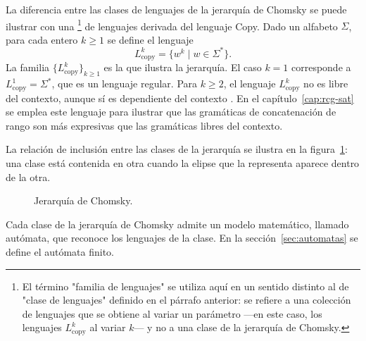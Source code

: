 \documentclass{article}
\theoremstyle{definition}
\theoremstyle{plain}
\theoremstyle{remark}
\begin{document}
La diferencia entre las clases de lenguajes de la jerarquía de Chomsky
se puede ilustrar con una  \footnote{El término "familia de
  lenguajes" se utiliza aquí en un sentido distinto al de "clase de
  lenguajes" definido en el párrafo anterior: se refiere a una colección
  de lenguajes que se obtiene al variar un parámetro ---en este caso,
  los lenguajes $L_{\mathrm{copy}}^k$ al variar $k$--- y no a una clase
  de la jerarquía de Chomsky.} de lenguajes derivada del lenguaje Copy.
Dado un alfabeto $\Sigma$, para cada entero $k \ge 1$ se define el
lenguaje
\[
  L_{\mathrm{copy}}^k = \{ w^k \mid w \in \Sigma^* \}.
\]
La familia $\{L_{\mathrm{copy}}^k\}_{k \ge 1}$ es la que ilustra la
jerarquía.
El caso $k = 1$ corresponde a $L_{\mathrm{copy}}^1 = \Sigma^*$, que es
un lenguaje regular. Para $k \ge 2$, el lenguaje $L_{\mathrm{copy}}^k$
no es libre del contexto, aunque sí es dependiente del contexto
\cite{hopcroft2006introduction}. En el capítulo~\ref{cap:rcg-sat} se
emplea este lenguaje para ilustrar que las gramáticas de concatenación
de rango son más expresivas que las gramáticas libres del contexto.

La relación de inclusión entre las clases de la jerarquía se ilustra
en la figura~\ref{fig:chomsky}: una clase está contenida en otra
cuando la elipse que la representa aparece dentro de la otra.

\begin{figure}[H]
  \centering
  \caption{Jerarquía de Chomsky.}
  \label{fig:chomsky}
\end{figure}

Cada clase de la jerarquía de Chomsky admite un modelo matemático,
llamado autómata, que reconoce los lenguajes de la clase. En la
sección~\ref{sec:automatas} se define el autómata finito.
\end{document}
